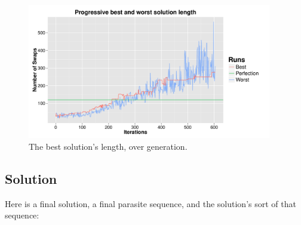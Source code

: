 \documentclass[11pt]{article}
\begin{document}
\begin{figure}[H]
  \centering
  \includegraphics[width=0.95\textwidth]{results/output-i600-length.pdf}
  \caption{The best solution's length, over generation.}
  \label{fig:best-solution-length}
\end{figure}

\subsection{Solution}

Here is a final solution, a final parasite sequence, and the solution's sort of that sequence:
\end{document}
